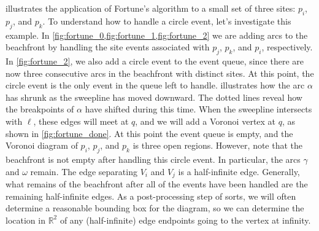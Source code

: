 \documentclass[12pt,twoside]{reedthesis}
\begin{document}
       illustrates the application of Fortune's algorithm to a small set of three sites: $p_{i}$, $p_{j}$, and $p_{k}$. To understand how to handle a circle event, let's investigate this example. In \cref{fig:fortune_0,fig:fortune_1,fig:fortune_2} we are adding arcs to the beachfront by handling the site events associated with $p_{j}$, $p_{k}$, and $p_{i}$, respectively. In \cref{fig:fortune_2}, we also add a circle event to the event queue, since there are now three consecutive arcs in the beachfront with distinct sites. At this point, the circle event is the only event in the queue left to handle.  illustrates how the arc $\alpha$ has shrunk as the sweepline has moved downward.  The dotted lines reveal how the breakpoints of $\alpha$ have shifted during this time. When the sweepline intersects with $\ell$, these edges will meet at $q$, and we will add a Voronoi vertex at $q$, as shown in \cref{fig:fortune_done}. At this point the event queue is empty, and the Voronoi diagram of $p_{i}$, $p_{j}$, and $p_{k}$ is three open regions.  However, note that the beachfront is not empty after handling this circle event. In particular, the arcs $\gamma$ and $\omega$ remain. The edge separating $V_{i}$ and $V_{j}$ is a half-infinite edge. Generally, what remains of the beachfront after all of the events have been handled are the remaining half-infinite edges. As a post-processing step of sorts, we will often determine a reasonable bounding box for the diagram, so we can determine the location in $\mathds{R}^2$ of any (half-infinite) edge endpoints going to the vertex at infinity.
   
\end{document}
